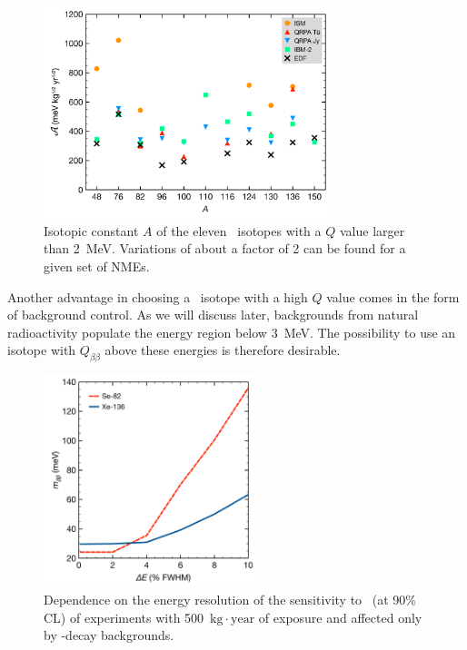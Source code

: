 \documentclass{PoS}
\begin{document}
\begin{figure}
\centering
\includegraphics[width=0.75\textwidth]{img/SpecificSensitivity.pdf}
\caption{Isotopic constant ${A}$  of the eleven \bb\ isotopes
with a $Q$ value larger than 2~MeV. Variations of about a factor of 2 can be found for a given set of NMEs.} \label{fig:IsotopicConstant}
\end{figure}


Another advantage in choosing a \bb\ isotope with a high $Q$ value comes in the form of background control. As we will discuss later, backgrounds from natural radioactivity populate the energy region below 3~MeV. The possibility to use an isotope with $Q_{\beta\beta}$ above these energies is therefore desirable.

\begin{figure}
\centering
\includegraphics[width=0.55\textwidth]{img/SensitivityVsResolution.pdf}
\caption{Dependence on the energy resolution of the sensitivity to \mbb\ (at 90\% CL) of experiments with 500~$\mathrm{kg}\cdot\mathrm{year}$ of exposure and affected only by \bbtnu-decay backgrounds.} \label{fig:SensitivityVsResolution}
\end{figure}
\end{document}
